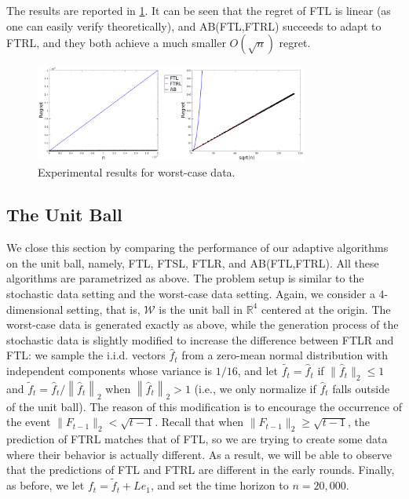 \documentclass[english]{article}
\newcommand{\cW}{\mathcal{W}}
\newcommand{\R}{\mathbb{R}}
\newcommand{\norm}[1]{\left\| #1 \right\|}
\begin{document}
The results are reported in \cref{res:worst_case}. It can be seen that the regret of FTL is linear (as one can easily verify theoretically), and 
AB(FTL,FTRL) succeeds to adapt to FTRL, and they both achieve a much smaller $O(\sqrt{n})$ regret. 

\begin{figure}[th]
	\centering
	\includegraphics[width=0.8\textwidth]{figures/ExpResults/WorstCase_alt_new}	
	\caption{Experimental results for worst-case data. \label{res:worst_case}}
\end{figure}


\subsection{The Unit Ball}
We close this section by comparing the performance of our adaptive algorithms on the unit ball, namely, FTL, FTSL, FTLR, and AB(FTL,FTRL). All these algorithms are parametrized as above. The problem setup is similar to the stochastic data setting and the worst-case data setting. Again, we consider a 4-dimensional setting, that is, $\cW$ is the unit ball in $\R^4$ centered at the origin.
The worst-case data is generated exactly as above, while the generation process of the stochastic data is slightly modified to increase the difference between FTLR and FTL: we sample the i.i.d. vectors $\hat{f}_t$ from a zero-mean normal distribution with independent components whose variance is $1/16$, and let $\tilde{f_t}=\hat{f}_t$ if $\|\hat{f}_t\|_2 \le 1$ and $\tilde{f}_t = \hat{f}_t/\norm{\hat{f}_t}_2$ when $\norm{\hat{f}_t}_2>1$ (i.e., we only normalize if $\hat{f}_t$ falls outside of the unit ball).
The reason of this modification is to encourage the occurrence of the event $\|F_{t-1}\|_2 < \sqrt{t-1}$. Recall that when $\|F_{t-1}\|_2 \ge \sqrt{t-1}$, the prediction of FTRL matches that of FTL, so we are trying to create some data where their behavior is actually different. As a result, we will be able to observe that the predictions of FTL and FTRL are different in the early rounds. Finally, as before, we let $f_t=\tilde{f}_t + L e_1$, and set the time horizon to $n=20,000$.
 
\end{document}
